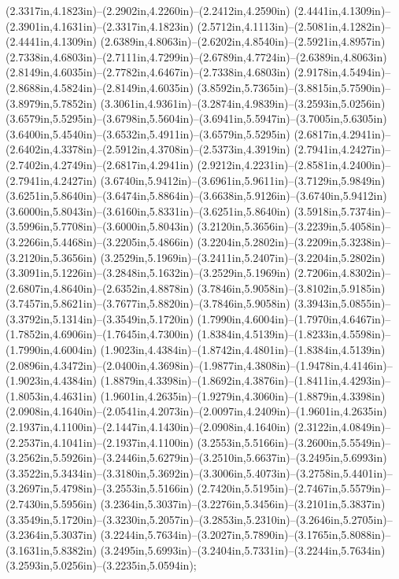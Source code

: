 (2.3317in,4.1823in)--(2.2902in,4.2260in)--(2.2412in,4.2590in) (2.4441in,4.1309in)--(2.3901in,4.1631in)--(2.3317in,4.1823in) (2.5712in,4.1113in)--(2.5081in,4.1282in)--(2.4441in,4.1309in) (2.6389in,4.8063in)--(2.6202in,4.8540in)--(2.5921in,4.8957in) (2.7338in,4.6803in)--(2.7111in,4.7299in)--(2.6789in,4.7724in)--(2.6389in,4.8063in) (2.8149in,4.6035in)--(2.7782in,4.6467in)--(2.7338in,4.6803in) (2.9178in,4.5494in)--(2.8688in,4.5824in)--(2.8149in,4.6035in) (3.8592in,5.7365in)--(3.8815in,5.7590in)--(3.8979in,5.7852in) (3.3061in,4.9361in)--(3.2874in,4.9839in)--(3.2593in,5.0256in) (3.6579in,5.5295in)--(3.6798in,5.5604in)--(3.6941in,5.5947in)--(3.7005in,5.6305in) (3.6400in,5.4540in)--(3.6532in,5.4911in)--(3.6579in,5.5295in) (2.6817in,4.2941in)--(2.6402in,4.3378in)--(2.5912in,4.3708in)--(2.5373in,4.3919in) (2.7941in,4.2427in)--(2.7402in,4.2749in)--(2.6817in,4.2941in) (2.9212in,4.2231in)--(2.8581in,4.2400in)--(2.7941in,4.2427in) (3.6740in,5.9412in)--(3.6961in,5.9611in)--(3.7129in,5.9849in) (3.6251in,5.8640in)--(3.6474in,5.8864in)--(3.6638in,5.9126in)--(3.6740in,5.9412in) (3.6000in,5.8043in)--(3.6160in,5.8331in)--(3.6251in,5.8640in) (3.5918in,5.7374in)--(3.5996in,5.7708in)--(3.6000in,5.8043in) (3.2120in,5.3656in)--(3.2239in,5.4058in)--(3.2266in,5.4468in)--(3.2205in,5.4866in) (3.2204in,5.2802in)--(3.2209in,5.3238in)--(3.2120in,5.3656in) (3.2529in,5.1969in)--(3.2411in,5.2407in)--(3.2204in,5.2802in) (3.3091in,5.1226in)--(3.2848in,5.1632in)--(3.2529in,5.1969in) (2.7206in,4.8302in)--(2.6807in,4.8640in)--(2.6352in,4.8878in) (3.7846in,5.9058in)--(3.8102in,5.9185in) (3.7457in,5.8621in)--(3.7677in,5.8820in)--(3.7846in,5.9058in) (3.3943in,5.0855in)--(3.3792in,5.1314in)--(3.3549in,5.1720in) (1.7990in,4.6004in)--(1.7970in,4.6467in)--(1.7852in,4.6906in)--(1.7645in,4.7300in) (1.8384in,4.5139in)--(1.8233in,4.5598in)--(1.7990in,4.6004in) (1.9023in,4.4384in)--(1.8742in,4.4801in)--(1.8384in,4.5139in) (2.0896in,4.3472in)--(2.0400in,4.3698in)--(1.9877in,4.3808in)--(1.9478in,4.4146in)--(1.9023in,4.4384in) (1.8879in,4.3398in)--(1.8692in,4.3876in)--(1.8411in,4.4293in)--(1.8053in,4.4631in) (1.9601in,4.2635in)--(1.9279in,4.3060in)--(1.8879in,4.3398in) (2.0908in,4.1640in)--(2.0541in,4.2073in)--(2.0097in,4.2409in)--(1.9601in,4.2635in) (2.1937in,4.1100in)--(2.1447in,4.1430in)--(2.0908in,4.1640in) (2.3122in,4.0849in)--(2.2537in,4.1041in)--(2.1937in,4.1100in) (3.2553in,5.5166in)--(3.2600in,5.5549in)--(3.2562in,5.5926in)--(3.2446in,5.6279in)--(3.2510in,5.6637in)--(3.2495in,5.6993in) (3.3522in,5.3434in)--(3.3180in,5.3692in)--(3.3006in,5.4073in)--(3.2758in,5.4401in)--(3.2697in,5.4798in)--(3.2553in,5.5166in) (2.7420in,5.5195in)--(2.7467in,5.5579in)--(2.7430in,5.5956in) (3.2364in,5.3037in)--(3.2276in,5.3456in)--(3.2101in,5.3837in) (3.3549in,5.1720in)--(3.3230in,5.2057in)--(3.2853in,5.2310in)--(3.2646in,5.2705in)--(3.2364in,5.3037in) (3.2244in,5.7634in)--(3.2027in,5.7890in)--(3.1765in,5.8088in)--(3.1631in,5.8382in) (3.2495in,5.6993in)--(3.2404in,5.7331in)--(3.2244in,5.7634in) (3.2593in,5.0256in)--(3.2235in,5.0594in);
